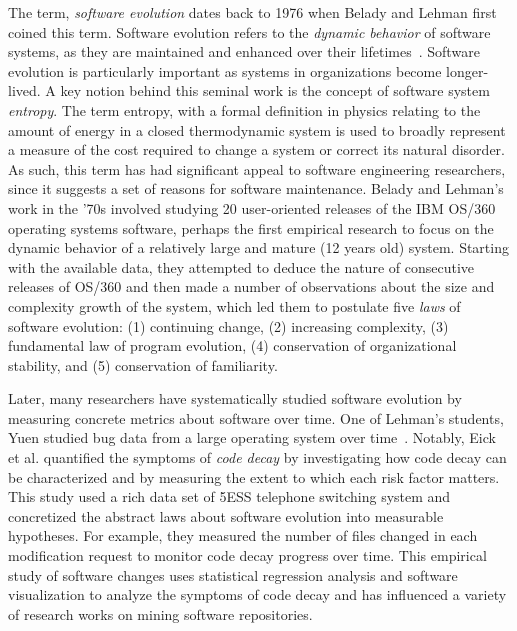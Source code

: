\documentclass[runningheads,a4paper]{llncs}
\begin{document}
The term, {\em software evolution} dates back to 1976 when Belady and Lehman first coined this term. Software evolution refers to the {\em dynamic behavior} of software systems, as they are maintained and enhanced over their lifetimes~\cite{Belady1976:ModelEvolution}. Software evolution is particularly important as systems in organizations become longer-lived. %
A key notion behind this seminal work is the concept of software system {\em entropy}. The term entropy, with a formal definition in physics relating to the amount of energy in a closed thermodynamic system is used to broadly represent a measure of the cost required to change a system or correct its natural disorder. As such, this term has had significant appeal to software engineering researchers, since it suggests a set of reasons for software maintenance. Belady and Lehman's work in the '70s involved studying 20 user-oriented releases of the IBM OS/360 operating systems software, perhaps the first empirical research to focus on the dynamic behavior of a relatively large and mature (12 years old) system. Starting with the available data, they attempted to deduce the nature of consecutive releases of OS/360 and then made a number of observations about the size and complexity growth of the system, which led them to postulate five {\em laws} of software evolution: (1) continuing change, (2) increasing complexity, (3) fundamental law of program evolution, (4) conservation of organizational stability, and (5) conservation of familiarity. 

Later, many researchers have systematically studied software evolution by measuring concrete metrics about software over time. One of Lehman's students, Yuen studied bug data from a large operating system over time~\cite{ChongHokYuen1986:EAS}. Notably, Eick et al.\cite{Eick2001:CodeDecay} quantified the symptoms of {\em code decay} by investigating how code decay can be characterized and by measuring the extent to which each risk factor matters. This study used a rich data set of 5ESS telephone switching system and concretized the abstract laws about software evolution into measurable hypotheses. For example, they measured the number of files changed in each modification request to monitor code decay progress over time. This empirical study of software changes uses statistical regression analysis and software visualization to analyze the symptoms of code decay and has influenced a variety of research works on mining software repositories.  %
\end{document}
